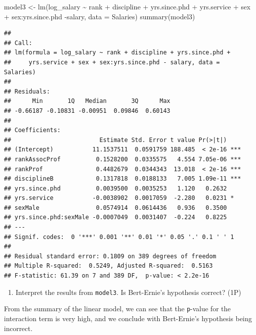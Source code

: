 \documentclass[
]{article}
\newenvironment{Shaded}{\begin{snugshade}}{\end{snugshade}}
\newcommand{\AttributeTok}[1]{\textcolor[rgb]{0.77,0.63,0.00}{#1}}
\newcommand{\FunctionTok}[1]{\textcolor[rgb]{0.00,0.00,0.00}{#1}}
\newcommand{\NormalTok}[1]{#1}
\newcommand{\OtherTok}[1]{\textcolor[rgb]{0.56,0.35,0.01}{#1}}
\newcommand{\SpecialCharTok}[1]{\textcolor[rgb]{0.00,0.00,0.00}{#1}}
\providecommand{\tightlist}{%
  \setlength{\itemsep}{0pt}\setlength{\parskip}{0pt}}
\begin{document}
\begin{Shaded}
\begin{Highlighting}[]
\NormalTok{model3 }\OtherTok{\textless{}{-}} \FunctionTok{lm}\NormalTok{(log\_salary }\SpecialCharTok{\textasciitilde{}}\NormalTok{ rank }\SpecialCharTok{+}\NormalTok{ discipline }\SpecialCharTok{+}\NormalTok{ yrs.since.phd }\SpecialCharTok{+}\NormalTok{ yrs.service }\SpecialCharTok{+}\NormalTok{ sex }\SpecialCharTok{+}\NormalTok{ sex}\SpecialCharTok{:}\NormalTok{yrs.since.phd }\SpecialCharTok{{-}}\NormalTok{salary, }\AttributeTok{data =}\NormalTok{ Salaries)}
\FunctionTok{summary}\NormalTok{(model3)}
\end{Highlighting}
\end{Shaded}

\begin{verbatim}
## 
## Call:
## lm(formula = log_salary ~ rank + discipline + yrs.since.phd + 
##     yrs.service + sex + sex:yrs.since.phd - salary, data = Salaries)
## 
## Residuals:
##      Min       1Q   Median       3Q      Max 
## -0.66187 -0.10831 -0.00951  0.09846  0.60143 
## 
## Coefficients:
##                         Estimate Std. Error t value Pr(>|t|)    
## (Intercept)           11.1537511  0.0591759 188.485  < 2e-16 ***
## rankAssocProf          0.1528200  0.0335575   4.554 7.05e-06 ***
## rankProf               0.4482679  0.0344343  13.018  < 2e-16 ***
## disciplineB            0.1317818  0.0188133   7.005 1.09e-11 ***
## yrs.since.phd          0.0039500  0.0035253   1.120   0.2632    
## yrs.service           -0.0038902  0.0017059  -2.280   0.0231 *  
## sexMale                0.0574914  0.0614436   0.936   0.3500    
## yrs.since.phd:sexMale -0.0007049  0.0031407  -0.224   0.8225    
## ---
## Signif. codes:  0 '***' 0.001 '**' 0.01 '*' 0.05 '.' 0.1 ' ' 1
## 
## Residual standard error: 0.1809 on 389 degrees of freedom
## Multiple R-squared:  0.5249, Adjusted R-squared:  0.5163 
## F-statistic: 61.39 on 7 and 389 DF,  p-value: < 2.2e-16
\end{verbatim}

\begin{enumerate}
\def\labelenumi{\roman{enumi})}
\setcounter{enumi}{1}
\tightlist
\item
  Interpret the results from \texttt{model3}. Is Bert-Ernie's hypothesis
  correct? (1P)
\end{enumerate}

From the summary of the linear model, we can see that the
\texttt{p}-value for the interaction term is very high, and we conclude
with Bert-Ernie's hypothesis being incorrect.
\end{document}
